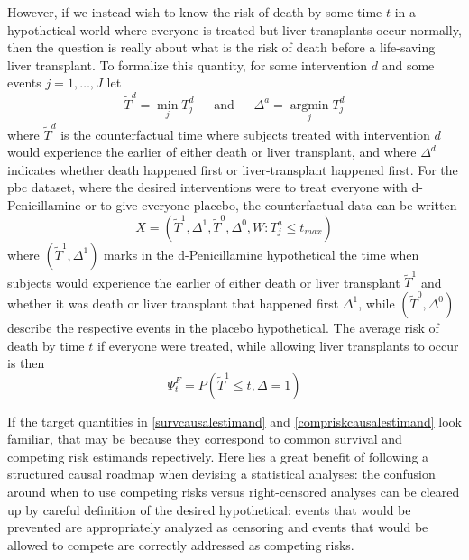 \documentclass{report}
\DeclareMathOperator*{\argmin}{argmin}
\newcommand{\1}{\ensuremath{\mathbf{1}}}
\newcommand{\T}{\ensuremath{\widetilde{T}}}
\renewcommand{\L}{\ensuremath{W}}
\begin{document}
However, if we instead wish to know the risk of death by some time \(t\) in a hypothetical world where everyone is treated but liver transplants occur normally, then the question is really about what is the risk of death before a life-saving liver transplant. To formalize this quantity, for some intervention \(d\) and some events \(j = 1,\dots, J\) let
\[ \T^d = \min\limits_{j} T^d_j \;\;\quad \text{and} \quad \;\; \Delta^a = \argmin\limits_{j} T^d_j \]
where \(\T^d\) is the counterfactual time where subjects treated with intervention \(d\) would experience the earlier of either death or liver transplant, and where \(\Delta^d\) indicates whether death happened first or liver-transplant happened first.
For the pbc dataset, where the desired interventions were to treat everyone with d-Penicillamine or to give everyone placebo, the counterfactual data can be written
\[ X = (\T^1, \Delta^1, \T^0, \Delta^0, \L : T^a_j \leq t_{max}) \]
where \((\T^1, \Delta^1)\) marks in the d-Penicillamine hypothetical the time when subjects would experience the earlier of either death or liver transplant \(\T^1\) and whether it was death or liver transplant that happened first \(\Delta^1\), while \((\T^0, \Delta^0)\) describe the respective events in the placebo hypothetical. The average risk of death by time \(t\) if everyone were treated, while allowing liver transplants to occur is then
\begin{equation}
 \Psi^F_t = P(\T^1 \leq t, \Delta = 1) \label{compriskcausalestimand}
\end{equation}

If the target quantities in \eqref{survcausalestimand} and \eqref{compriskcausalestimand} look familiar, that may be because they correspond to common survival and competing risk estimands repectively. Here lies a great benefit of following a structured causal roadmap when devising a statistical analyses: the confusion around when to use competing risks versus right-censored analyses can be cleared up by careful definition of the desired hypothetical: events that would be prevented are appropriately analyzed as censoring and events that would be allowed to compete are correctly addressed as competing risks.
\end{document}
